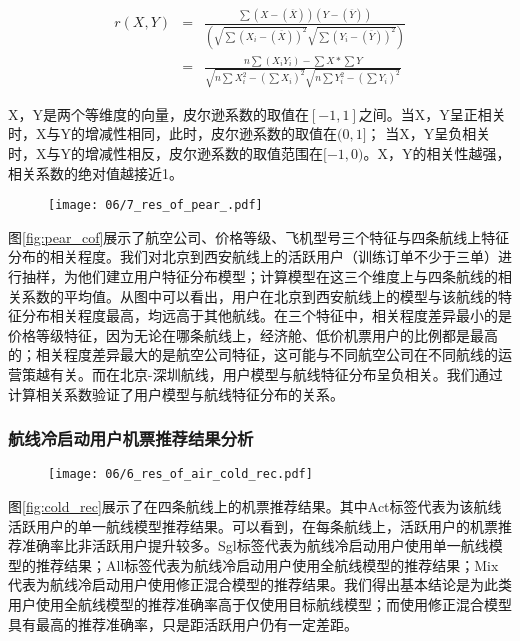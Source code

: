\begin{eqnarray}
	r(X,Y)  & = & \frac{\sum(X-(\overline{X}))(Y-(\overline{Y}))}{(\sqrt{\sum(X_i-(\overline{X}))^2}\sqrt{\sum(Y_i-(\overline{Y}))^2})} \nonumber \\
	& = & \frac{n\sum(X_iY_i)-\sum X *\sum Y}{\sqrt{n\sum X_i^2 - (\sum X_i)^2}\sqrt{n\sum Y_i^2 - (\sum Y_i)^2}}
\end{eqnarray}

X，Y是两个等维度的向量，皮尔逊系数的取值在$[-1,1]$之间。当X，Y呈正相关时，X与Y的增减性相同，此时，皮尔逊系数的取值在$(0,1]$；
当X，Y呈负相关时，X与Y的增减性相反，皮尔逊系数的取值范围在$[-1,0)$。X，Y的相关性越强，相关系数的绝对值越接近1。

\begin{figure}[!h]
 \centering
 \texttt{[image: 06/7\_res\_of\_pear\_.pdf]}
\end{figure}

图\ref{fig:pear_cof}展示了航空公司、价格等级、飞机型号三个特征与四条航线上特征分布的相关程度。我们对北京到西安航线上的活跃用户（训练订单不少于三单）进行抽样，为他们建立用户特征分布模型；计算模型在这三个维度上与四条航线的相关系数的平均值。从图中可以看出，用户在北京到西安航线上的模型与该航线的特征分布相关程度最高，均远高于其他航线。在三个特征中，相关程度差异最小的是价格等级特征，因为无论在哪条航线上，经济舱、低价机票用户的比例都是最高的；相关程度差异最大的是航空公司特征，这可能与不同航空公司在不同航线的运营策越有关。而在北京-深圳航线，用户模型与航线特征分布呈负相关。我们通过计算相关系数验证了用户模型与航线特征分布的关系。

\subsubsection{航线冷启动用户机票推荐结果分析}

\begin{figure}
 \centering
 \texttt{[image: 06/6\_res\_of\_air\_cold\_rec.pdf]}
\end{figure}

图\ref{fig:cold_rec}展示了在四条航线上的机票推荐结果。其中Act标签代表为该航线活跃用户的单一航线模型推荐结果。可以看到，在每条航线上，活跃用户的机票推荐准确率比非活跃用户提升较多。Sgl标签代表为航线冷启动用户使用单一航线模型的推荐结果；All标签代表为航线冷启动用户使用全航线模型的推荐结果；Mix代表为航线冷启动用户使用修正混合模型的推荐结果。我们得出基本结论是为此类用户使用全航线模型的推荐准确率高于仅使用目标航线模型；而使用修正混合模型具有最高的推荐准确率，只是距活跃用户仍有一定差距。


